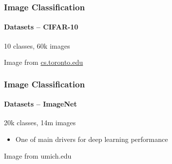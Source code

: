 \documentclass[xetex,professionalfont]{beamer}
\begin{document}
\begin{frame}
\frametitle{Image Classification}
\framesubtitle{Datasets -- CIFAR-10}

10 classes, 60k images

\bigskip

\begin{center}
    {\centering Image from \href{https://www.cs.toronto.edu/~kriz/cifar.html}{cs.toronto.edu}}
\end{center}

\end{frame}


\begin{frame}
\frametitle{Image Classification}
\framesubtitle{Datasets -- ImageNet}

20k classes, 14m images %
\begin{itemize}
    \item One of main drivers for deep learning performance %
\end{itemize}

\bigskip

\begin{center}
    {\centering Image from umich.edu}
\end{center}

\end{frame}
\end{document}
